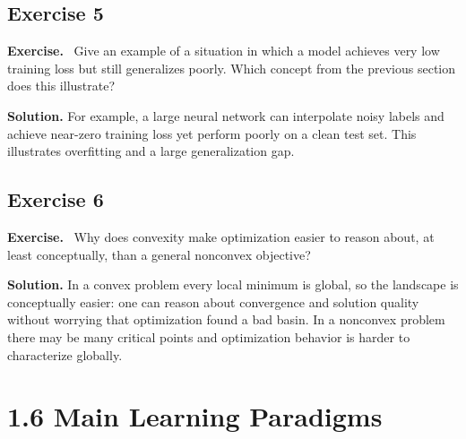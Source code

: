 \documentclass[11pt]{article}
\newenvironment{exercisebox}{\begin{framed}\noindent\textbf{Exercise.}\ }{\end{framed}}
\begin{document}
\subsection*{Exercise 5}
\begin{exercisebox}
Give an example of a situation in which a model achieves very low training loss but still generalizes poorly. Which concept from the previous section does this illustrate?
\end{exercisebox}
\textbf{Solution.} For example, a large neural network can interpolate noisy labels and achieve near-zero training loss yet perform poorly on a clean test set. This illustrates overfitting and a large generalization gap.

\subsection*{Exercise 6}
\begin{exercisebox}
Why does convexity make optimization easier to reason about, at least conceptually, than a general nonconvex objective?
\end{exercisebox}
\textbf{Solution.} In a convex problem every local minimum is global, so the landscape is conceptually easier: one can reason about convergence and solution quality without worrying that optimization found a bad basin. In a nonconvex problem there may be many critical points and optimization behavior is harder to characterize globally.

\section{1.6 Main Learning Paradigms}
\end{document}
